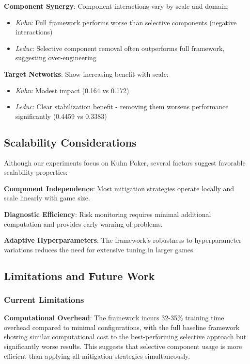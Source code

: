 \documentclass[12pt,a4paper]{article}
\begin{document}
\textbf{Component Synergy}: Component interactions vary by scale and domain:
\begin{itemize}
\item \textit{Kuhn}: Full framework performs worse than selective components (negative interactions)
\item \textit{Leduc}: Selective component removal often outperforms full framework, suggesting over-engineering
\end{itemize}

\textbf{Target Networks}: Show increasing benefit with scale:
\begin{itemize}
\item \textit{Kuhn}: Modest impact (0.164 vs 0.172)
\item \textit{Leduc}: Clear stabilization benefit - removing them worsens performance significantly (0.4459 vs 0.3383)
\end{itemize}

\subsection{Scalability Considerations}

Although our experiments focus on Kuhn Poker, several factors suggest favorable scalability properties:

\textbf{Component Independence}: Most mitigation strategies operate locally and scale linearly with game size.

\textbf{Diagnostic Efficiency}: Risk monitoring requires minimal additional computation and provides early warning of problems.

\textbf{Adaptive Hyperparameters}: The framework's robustness to hyperparameter variations reduces the need for extensive tuning in larger games.

\subsection{Limitations and Future Work}

\subsubsection{Current Limitations}

\textbf{Computational Overhead}: The framework incurs 32-35\% training time overhead compared to minimal configurations, with the full baseline framework showing similar computational cost to the best-performing selective approach but significantly worse results. This suggests that selective component usage is more efficient than applying all mitigation strategies simultaneously.
\end{document}
